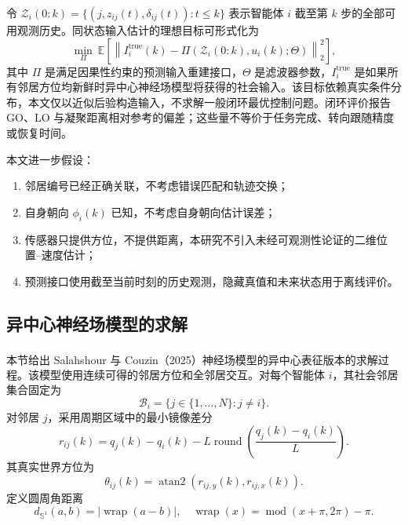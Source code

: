 \documentclass[UTF8,fontset=windows,11pt]{ctexart}
\newcommand{\upcite}[1]{\textsuperscript{\cite{#1}}}
\begin{document}
令 $\mathcal Z_i(0:k)=\{(j,z_{ij}(t),\delta_{ij}(t)):t\le k\}$ 表示智能体 $i$ 截至第 $k$ 步的全部可用观测历史。同状态输入估计的理想目标可形式化为
\begin{equation}
 \min_{\Pi}\ \mathbb E\left[
 \left\|I_i^{\mathrm{true}}(k)-\Pi(\mathcal Z_i(0:k),u_i(k);\Theta)\right\|_2^2
 \right],
\end{equation}
其中 $\Pi$ 是满足因果性约束的预测输入重建接口，$\Theta$ 是滤波器参数，$I_i^{\mathrm{true}}$ 是如果所有邻居方位均新鲜时异中心神经场模型将获得的社会输入。该目标依赖真实条件分布，本文仅以近似后验构造输入，不求解一般闭环最优控制问题。闭环评价报告 GO、LO 与凝聚距离相对参考的偏差；这些量不等价于任务完成、转向跟随精度或恢复时间。

本文进一步假设：

\begin{enumerate}[label=(\arabic*)]
 \item 邻居编号已经正确关联，不考虑错误匹配和轨迹交换；
 \item 自身朝向 $\phi_i(k)$ 已知，不考虑自身朝向估计误差；
 \item 传感器只提供方位，不提供距离，本研究不引入未经可观测性论证的二维位置--速度估计；
 \item 预测接口使用截至当前时刻的历史观测，隐藏真值和未来状态用于离线评价。
\end{enumerate}

\subsection{异中心神经场模型的求解}

本节给出 Salahshour 与 Couzin（2025）神经场模型的异中心表征版本\upcite{Salahshour2025}的求解过程。该模型使用连续可得的邻居方位和全邻居交互。对每个智能体 $i$，其社会邻居集合固定为
\begin{equation}
 \mathcal B_i=\{j\in\{1,\ldots,N\}:j\ne i\}.
\end{equation}
对邻居 $j$，采用周期区域中的最小镜像差分
\begin{equation}
 r_{ij}(k)=q_j(k)-q_i(k)-L\operatorname{round}\left(\frac{q_j(k)-q_i(k)}{L}\right).
\end{equation}
其真实世界方位为
\begin{equation}
 \theta_{ij}(k)=\operatorname{atan2}(r_{ij,y}(k),r_{ij,x}(k)).
\end{equation}
定义圆周角距离
\begin{equation}
 d_{\mathbb S^1}(a,b)=\left|\operatorname{wrap}(a-b)\right|,
\quad \operatorname{wrap}(x)=\operatorname{mod}(x+\pi,2\pi)-\pi.
\end{equation}
\end{document}

